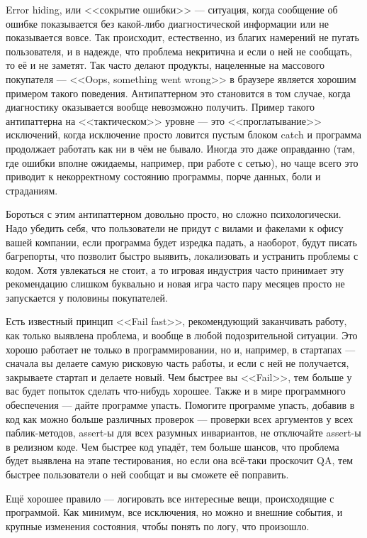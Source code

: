\documentclass{../../text-style}
\begin{document}
Error hiding, или <<сокрытие ошибки>> --- ситуация, когда сообщение об ошибке показывается без какой-либо диагностической информации или не показывается вовсе. Так происходит, естественно, из благих намерений не пугать пользователя, и в надежде, что проблема некритична и если о ней не сообщать, то её и не заметят. Так часто делают продукты, нацеленные на массового покупателя --- <<Oops, something went wrong>> в браузере является хорошим примером такого поведения. Антипаттерном это становится в том случае, когда диагностику оказывается вообще невозможно получить. Пример такого антипаттерна на <<тактическом>> уровне --- это <<проглатывание>> исключений, когда исключение просто ловится пустым блоком catch и программа продолжает работать как ни в чём не бывало. Иногда это даже оправданно (там, где ошибки вполне ожидаемы, например, при работе с сетью), но чаще всего это приводит к некорректному состоянию программы, порче данных, боли и страданиям.

Бороться с этим антипаттерном довольно просто, но сложно психологически. Надо убедить себя, что пользователи не придут с вилами и факелами к офису вашей компании, если программа будет изредка падать, а наоборот, будут писать багрепорты, что позволит быстро выявить, локализовать и устранить проблемы с кодом. Хотя увлекаться не стоит, а то игровая индустрия часто принимает эту рекомендацию слишком буквально и новая игра часто пару месяцев просто не запускается у половины покупателей. 

Есть известный принцип <<Fail fast>>, рекомендующий заканчивать работу, как только выявлена проблема, и вообще в любой подозрительной ситуации. Это хорошо работает не только в программировании, но и, например, в стартапах --- сначала вы делаете самую рисковую часть работы, и если с ней не получается, закрываете стартап и делаете новый. Чем быстрее вы <<Fail>>, тем больше у вас будет попыток сделать что-нибудь хорошее. Также и в мире программного обеспечения --- дайте программе упасть. Помогите программе упасть, добавив в код как можно больше различных проверок --- проверки всех аргументов у всех паблик-методов, assert-ы для всех разумных инвариантов, не отключайте assert-ы в релизном коде. Чем быстрее код упадёт, тем больше шансов, что проблема будет выявлена на этапе тестирования, но если она всё-таки проскочит QA, тем быстрее пользователи о ней сообщат и вы сможете её поправить.

Ещё хорошее правило --- логировать все интересные вещи, происходящие с программой. Как минимум, все исключения, но можно и внешние события, и крупные изменения состояния, чтобы понять по логу, что произошло.
\end{document}
